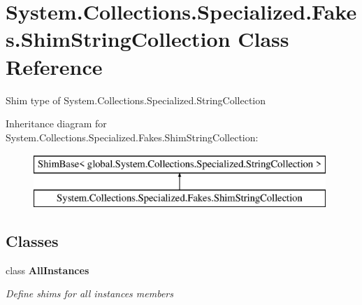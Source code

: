 \hypertarget{class_system_1_1_collections_1_1_specialized_1_1_fakes_1_1_shim_string_collection}{\section{System.\-Collections.\-Specialized.\-Fakes.\-Shim\-String\-Collection Class Reference}
\label{class_system_1_1_collections_1_1_specialized_1_1_fakes_1_1_shim_string_collection}
}


Shim type of System.\-Collections.\-Specialized.\-String\-Collection 


Inheritance diagram for System.\-Collections.\-Specialized.\-Fakes.\-Shim\-String\-Collection\-:\begin{figure}[H]
\begin{center}
\leavevmode
\includegraphics[height=2.000000cm]{class_system_1_1_collections_1_1_specialized_1_1_fakes_1_1_shim_string_collection}
\end{center}
\end{figure}
\subsection*{Classes}
\begin{DoxyCompactItemize}
\item 
class {\bfseries All\-Instances}
\begin{DoxyCompactList}\small\item\em Define shims for all instances members\end{DoxyCompactList}\end{DoxyCompactItemize}
